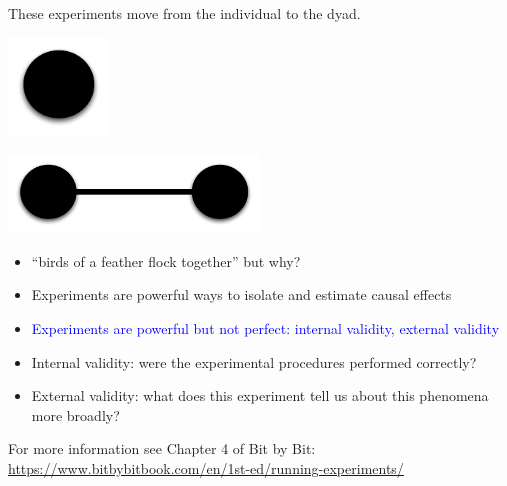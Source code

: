 \documentclass[aspectratio=169]{beamer}
\begin{document}
\begin{frame}

These experiments move from the individual to the dyad.

\begin{center}
\includegraphics[width=0.2\textwidth]{figures/point}
\end{center}

\pause

\begin{center}
\includegraphics[width=0.5\textwidth]{figures/dyad}
\end{center}

\end{frame}
\begin{frame}

\begin{itemize}
\item ``birds of a feather flock together'' but why? 
\item Experiments are powerful ways to isolate and estimate causal effects
\item \textcolor{blue}{Experiments are powerful but not perfect: internal validity, external validity}
\end{itemize}

\end{frame}
\begin{frame}

\begin{itemize}
\item Internal validity: were the experimental procedures performed correctly? \pause
\item External validity: what does this experiment tell us about this phenomena more broadly?
\end{itemize}

\vfill
For more information see Chapter 4 of Bit by Bit: \url{https://www.bitbybitbook.com/en/1st-ed/running-experiments/}

\end{frame}
\end{document}
